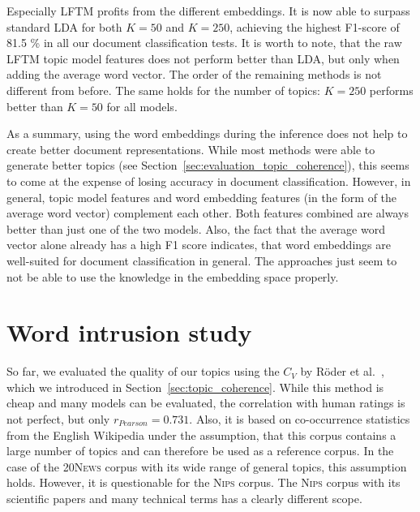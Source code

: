 \documentclass[
        a4paper,
        titlepage,
        twoside,
        parskip,
        numbers=noenddot
        ]{scrbook}
\theoremstyle{break}
\begin{document}
Especially LFTM profits from the different embeddings.
It is now able to surpass standard LDA for both $K = 50$ and $K = 250$, achieving the highest F1-score of 81.5 \% in all our document classification tests.
It is worth to note, that the raw LFTM topic model features does not perform better than LDA, but only when adding the average word vector.
The order of the remaining methods is not different from before.
The same holds for the number of topics: $K = 250$ performs better than $K = 50$ for all models.

As a summary, using the word embeddings during the inference does not help to create better document representations.
While most methods were able to generate better topics (see Section~\ref{sec:evaluation_topic_coherence}), this seems to come at the expense of losing accuracy in document classification.
However, in general, topic model features and word embedding features (in the form of the average word vector) complement each other.
Both features combined are always better than just one of the two models.
Also, the fact that the average word vector alone already has a high F1 score indicates, that word embeddings are well-suited for document classification in general.
The approaches just seem to not be able to use the knowledge in the embedding space properly.

\section{Word intrusion study}

So far, we evaluated the quality of our topics using the $C_V$ by Röder et al.~\cite{Roder2015}, which we introduced in Section~\ref{sec:topic_coherence}.
While this method is cheap and many models can be evaluated, the correlation with human ratings is not perfect, but only $r_{Pearson} = 0.731$.
Also, it is based on co-occurrence statistics from the English Wikipedia under the assumption, that this corpus contains a large number of topics and can therefore be used as a reference corpus.
In the case of the \textsc{20News} corpus with its wide range of general topics, this assumption holds.
However, it is questionable for the \textsc{Nips} corpus.
The \textsc{Nips} corpus with its scientific papers and many technical terms has a clearly different scope.
\end{document}

